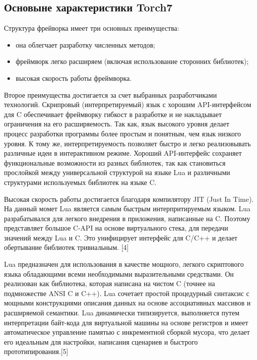 \documentclass[a4paper,english,russian]{G2-105}
\begin{document}
\subsection{Основыне характеристики Torch7}
\par Структура фрейворка имеет три основных преимущества:
\begin{itemize}
\item она облегчает разработку численных методов;
\item фреймворк легко расширяем (включая использование сторонних библиотек);
\item высокая скорость работы фреймворка.
\end{itemize}
\par Второе преимущества достигается за счет выбранных разработчиками технологий. Скрипровый (интерпретируемый) язык с хорошим API-интерфейсом для C обеспечивает фреймворку гибкост в разработке и не накладывает ограничения на   его расширяемость. Так как, язык высокого уровня делает процесс разработки программы более простым и понятным, чем язык низкого уровня. К тому же, интерпретируемость позволяет быстро и легко реализовывать различные идеи в интерактивном режиме. Хороший API-интерфейс сохраняет функциональные возможности из разных библиотек, так как становиться прослойкой между универсальной структурой на языке Lua и различными структурами используемых библиотек на языке C.
\par Высокая скорость работы достигается благодаря компилятору JIT (Just In Time). На данный момет Lua является самым быстрым интерпритируемым языком. Lua разрабатывался для легкого внедрения в приложения, написанные на C. Поэтому представляет большое C-API на основе виртуального стека, для передачи значений между Lua и C. Это унифицирует интерфейс для C/C++ и делает обертывание библиотек тривиальным. [4]
\par Lua предназначен для использования в качестве мощного, легкого скриптового языка обладающими всеми необходимыми выразительными средствами. Он реализован как библиотека, которая написана на чистом C (точнее на подмножестве ANSI C и C++). Lua сочетает простой процедурный синтаксис с мощными конструкциями описания данных на основе ассоциативных массивов и расширяемой семантики. Lua динамически типизируется, выполняется путем интерпретации байт-кода для виртуальной машины на основе регистров и имеет автоматическое управление памятью с инкрементной сборкой мусора, что делает его идеальным для настройки, написания сценариев и быстрого прототипирования.[5]
\end{document}
